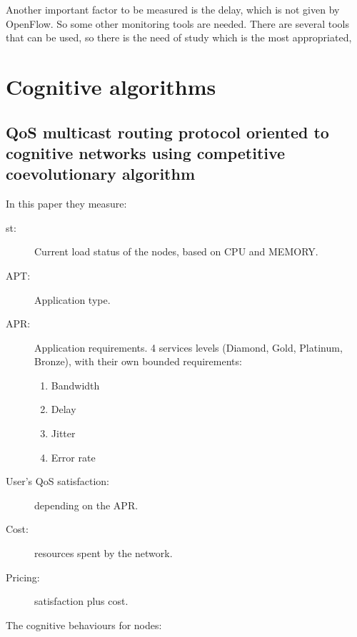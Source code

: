 Another important factor to be measured is the delay, which is not given by OpenFlow. So some other monitoring tools are needed. There are several tools that can be used, so there is the need of study which is the most appropriated,  

\newpage

\section{Cognitive algorithms}
\subsection{QoS multicast routing protocol oriented to cognitive networks using competitive coevolutionary algorithm}
\label{sec:cogMRT}

In this paper \cite{cogMRT} they measure:\\ 

\begin{description}
\item [st:] Current load status of the nodes, based on CPU and MEMORY.
\item [APT:] Application type.
\item [APR:] Application requirements. 4 services levels (Diamond, Gold, Platinum, Bronze), with their own bounded requirements:
	\begin{enumerate}
	\item Bandwidth 
	\item Delay
	\item Jitter
	\item Error rate
	\end{enumerate}
\item [User's QoS satisfaction:] depending on the APR.
\item [Cost:] resources spent by the network.
\item[Pricing:] satisfaction plus cost.\\
\end{description}

The cognitive behaviours for nodes:\\

